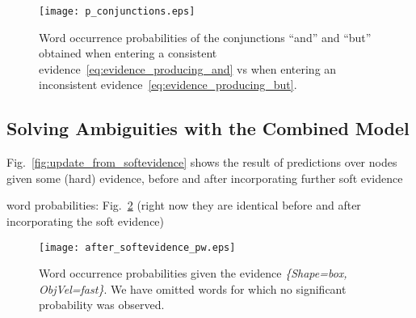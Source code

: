 
\begin{figure}
\centering
\texttt{[image: p\_conjunctions.eps]}
\caption{Word occurrence probabilities of the conjunctions ``and'' and ``but'' obtained when entering a consistent \actioneffect{} evidence~\eqref{eq:evidence_producing_and} vs when entering an inconsistent \actioneffect{} evidence~\eqref{eq:evidence_producing_but}.}
\label{fig:p_conjunctions}
\end{figure}

\subsection{Solving Ambiguities with the Combined Model}

Fig.~\ref{fig:update_from_softevidence} shows the result of predictions over nodes given some (hard) evidence, before and after incorporating further soft evidence

\begin{figure*}
    \centering
     \quad
    \caption{.}
    \label{fig:update_from_softevidence}
\end{figure*}

word probabilities: Fig.~\ref{fig:after_softevidence:pw} (right now they are identical before and after incorporating the soft evidence)

\begin{figure}
\centering
\texttt{[image: after\_softevidence\_pw.eps]}
\caption{Word occurrence probabilities given the evidence \emph{\{Shape=box, ObjVel=fast\}}. We have omitted words for which no significant probability was observed.}
\label{fig:after_softevidence:pw}
\end{figure}
